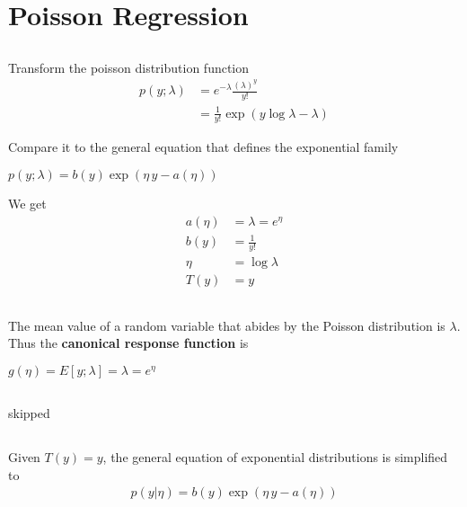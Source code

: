 \documentclass[main]{subfiles}
\begin{document}
\section{Poisson Regression}
\label{sec:poisson_regression}

\subsection{}

Transform the poisson distribution function
\begin{align*}
	p(y;\lambda)
		&=
			e^{-\lambda}
			\frac {(\lambda)^y} {y!} 			\\
		&=
			\frac {1} {y!}
			\exp (
				y \log \lambda - \lambda
			)
\end{align*}

Compare it to the general equation that defines the exponential family
\begin{center}
\begin{math}
	p(y;\lambda) =
		b(y) \exp ( \eta \, y - a(\eta) )
\end{math}
\end{center}

We get
\begin{align*}
	a(\eta) 	&=
			\lambda = e^{\eta} 					\\
	b(y)		&=
			\frac {1} {y!}						\\
	\eta 		&=
			\log \lambda						\\
	T(y)		&=
			y
\end{align*}

\subsection{}

The mean value of a random variable that abides by the Poisson distribution is
$\lambda$. Thus the \textbf{canonical response function} is
\begin{center}
\begin{math}
	g(\eta) = E[y;\lambda] = \lambda = e^{\eta}
\end{math}
\end{center}

\subsection{}
skipped

\subsection{}
Given $T(y) = y$, the general equation of exponential distributions is
simplified to
\begin{align*}
	p(y|\eta) =
		b(y) \exp ( \eta \, y - a(\eta) )
\end{align*}
\end{document}
